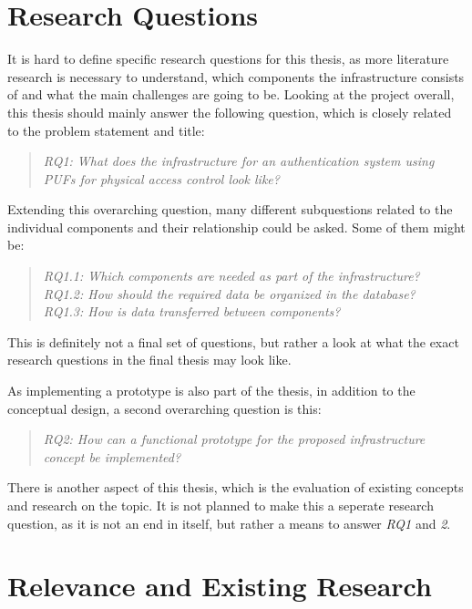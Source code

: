\newpage
\section{Research Questions}

It is hard to define specific research questions for this thesis, as more literature research is necessary
to understand, which components the infrastructure consists of and what the main challenges are going to be.
Looking at the project overall, this thesis should mainly answer the following question, which is closely
related to the problem statement and title:

\begin{quote}
\emph{RQ1: What does the infrastructure for an authentication system using \acp{PUF} for physical access control look like?}
\end{quote}

Extending this overarching question, many different subquestions related to the individual components and their relationship could be asked.
Some of them might be:

\begin{quote}
\emph{RQ1.1: Which components are needed as part of the infrastructure?}\\
\emph{RQ1.2: How should the required data be organized in the database?}\\
\emph{RQ1.3: How is data transferred between components?}
\end{quote}

This is definitely not a final set of questions, but rather a look at what the exact research questions in the final thesis may look like.

As implementing a prototype is also part of the thesis, in addition to the conceptual design, 
a second overarching question is this:

\begin{quote}
\emph{RQ2: How can a functional prototype for the proposed infrastructure concept be implemented?}
\end{quote}

There is another aspect of this thesis, which is the evaluation of existing concepts and research on the topic.
It is not planned to make this a seperate research question, as it is not an end in
itself, but rather a means to answer \emph{RQ1} and \emph{2}.

\newpage
\section{Relevance and Existing Research}

